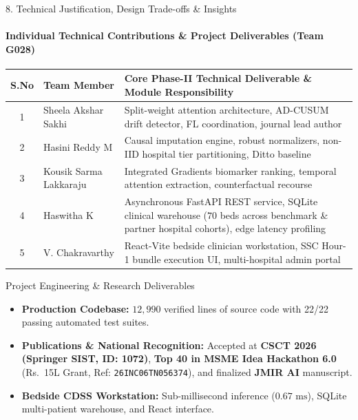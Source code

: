\documentclass[aspectratio=169, 11pt]{beamer}
\begin{document}
\begin{frame}{8. Technical Justification, Design Trade-offs \& Insights}
    \framesubtitle{Individual Technical Contributions \& Project Deliverables (Team G028)}
    \begin{table}
        \centering
        \scriptsize
        \renewcommand{\arraystretch}{0.88}
        \begin{tabular}{|c|l|p{6.8cm}|}
            \hline
            \textbf{S.No} & \textbf{Team Member} & \textbf{Core Phase-II Technical Deliverable \& Module Responsibility} \\
            \hline
            1 & Sheela Akshar Sakhi & Split-weight attention architecture, AD-CUSUM drift detector, FL coordination, journal lead author \\
            \hline
            2 & Hasini Reddy M & Causal imputation engine, robust normalizers, non-IID hospital tier partitioning, Ditto baseline \\
            \hline
            3 & Kousik Sarma Lakkaraju & Integrated Gradients biomarker ranking, temporal attention extraction, counterfactual recourse \\
            \hline
            4 & Haswitha K & Asynchronous FastAPI REST service, SQLite clinical warehouse ($70$ beds across benchmark \& partner hospital cohorts), edge latency profiling \\
            \hline
            5 & V. Chakravarthy & React-Vite bedside clinician workstation, SSC Hour-1 bundle execution UI, multi-hospital admin portal \\
            \hline
        \end{tabular}
    \end{table}
    \vspace{-0.08cm}

    \begin{block}{Project Engineering \& Research Deliverables}
        \scriptsize
        \begin{itemize}
            \item \textbf{Production Codebase:} $12,990$ verified lines of source code with 22/22 passing automated test suites.
            \item \textbf{Publications \& National Recognition:} Accepted at \textbf{CSCT 2026 (Springer SIST, ID: 1072)}, \textbf{Top 40 in MSME Idea Hackathon 6.0} (Rs.~15L Grant, Ref: \texttt{26INC06TN056374}), and finalized \textbf{JMIR AI} manuscript.
            \item \textbf{Bedside CDSS Workstation:} Sub-millisecond inference ($0.67\text{ ms}$), SQLite multi-patient warehouse, and React interface.
        \end{itemize}
    \end{block}
\end{frame}
\end{document}
